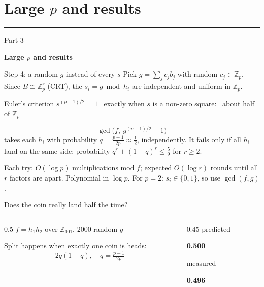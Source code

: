 \documentclass[aspectratio=169,11pt]{beamer}
\newcommand{\Zp}{\mathbb{Z}_p}
\newcommand{\aside}[1]{{\color{muted}\small #1}}
\newcommand{\partslide}[3]{%
  \section{#2}
  \begin{frame}[plain]
    \vfill
    {\color{#1}\rule{3em}{4pt}}\par\vspace{0.6em}
    {\color{muted}\large #3}\par\vspace{0.3em}
    {\Huge\bfseries #2}
    \vfill
  \end{frame}}
\begin{document}
\partslide{m3}{Large $p$ and results}{Part 3}

\begin{frame}{Step 4: a random $g$ instead of every $s$}
  Pick $g = \sum_j c_j b_j$ with random $c_j \in \Zp$. Since $B \cong \Zp^r$ (CRT), the $s_i = g \bmod h_i$
  are independent and uniform in $\Zp$.
  \medskip
  \begin{block}{Euler's criterion}
    $s^{(p-1)/2} = 1$ \ exactly when $s$ is a non-zero square: \ about half of $\Zp$
  \end{block}
  \medskip
  \[ \gcd\big(f,\ g^{(p-1)/2} - 1\big) \]
  takes each $h_i$ with probability $q = \tfrac{p-1}{2p} \approx \tfrac12$, independently.
  It fails only if all $h_i$ land on the same side: probability $q^r + (1-q)^r \le \tfrac59$ for $r \ge 2$.\par
  \medskip
  \aside{Each try: $O(\log p)$ multiplications mod $f$; expected $O(\log r)$ rounds until all $r$ factors are apart.
  Polynomial in $\log p$. \quad For $p = 2$: $s_i \in \{0, 1\}$, so use $\gcd(f, g)$.}
\end{frame}

\begin{frame}{Does the coin really land half the time?}
  \begin{columns}[c]
    \begin{column}{0.5\textwidth}
      $f = h_1 h_2$ over $\mathbb{Z}_{101}$, 2000 random $g$\par\bigskip
      Split happens when exactly one coin is heads:
      \[ 2q(1-q), \quad q = \tfrac{p-1}{2p} \]
    \end{column}
    \begin{column}{0.45\textwidth}
      \centering
      {\color{muted}predicted}\par
      {\fontsize{28}{30}\selectfont\bfseries 0.500}\par\bigskip
      {\color{muted}measured}\par
      {\fontsize{28}{30}\selectfont\bfseries\color{customblue} 0.496}
    \end{column}
  \end{columns}
\end{frame}
\end{document}
